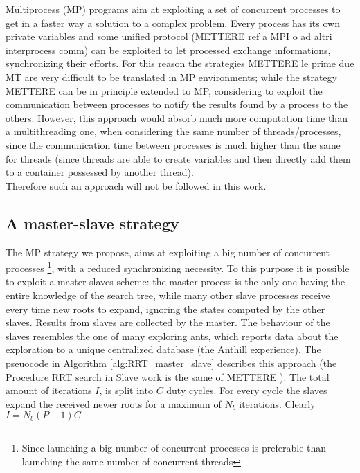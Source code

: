 Multiprocess (MP) programs aim at exploiting a set of concurrent processes to get in a faster way a solution to a complex problem. Every process has its own private variables and some unified protocol (METTERE ref a MPI o ad altri interprocess comm) can be exploited to let processed exchange informations, synchronizing their efforts.
For this reason the strategies METTERE le prime due MT are very difficult to be translated in MP environments; while the strategy METTERE can be in principle extended to MP, considering to exploit the communication between processes to notify the results found by a process to the others.
However, this approach would absorb much more computation time than a multithreading one, when considering the same number of threads/processes, since the communication time between processes is much higher than the same for threads (since threads are able to create variables and then directly add them to a container possessed by another thread).
\\
Therefore such an approach will not be followed in this work.        

\subsection{A master-slave strategy}

The MP strategy we propose, aims at exploiting a big number of concurrent processes \footnote{Since launching a big number of concurrent processes is preferable than launching the same number of concurrent threads}, with a reduced synchronizing necessity.
To this purpose it is possible to exploit a master-slaves scheme: the master process is the only one having the entire knowledge of the search tree, while many other slave processes receive every time new roots to expand, ignoring the states computed by the other slaves.
Results from slaves are collected by the master.
The behaviour of the slaves resembles the one of many exploring ants, which reports data about the exploration to a unique centralized database (the Anthill experience).  The pseuocode in Algorithm \ref{alg:RRT_master_slave} describes this approach (the Procedure RRT search in Slave work is the same of METTERE ). The total amount of iterations $I$, is split into $C$ duty cycles. For every cycle the slaves expand the received newer roots for a maximum of $N_b$ iterations.
Clearly $I=N_b (P-1) C$ 


